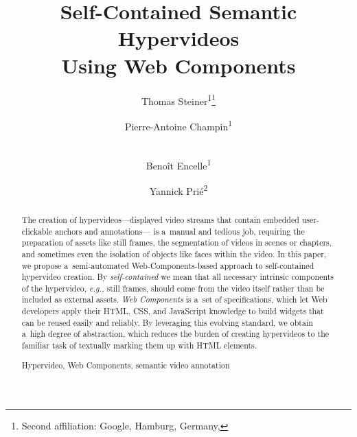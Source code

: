 \documentclass[runningheads,a4paper]{llncs}
\newcommand{\keywords}[1]{\par\addvspace\baselineskip
\noindent\keywordname\enspace\ignorespaces#1}
\begin{document}
\mainmatter  %

\title{Self-Contained Semantic Hypervideos\\ Using Web Components}


\author{
  Thomas Steiner\textsuperscript{1}\thanks{Second affiliation: Google, Hamburg, Germany, } \and
  Pierre-Antoine Champin\textsuperscript{1} \and \\
  Benoît Encelle\textsuperscript{1}\and
  Yannick Prié\textsuperscript{2}
}
%


\maketitle

\begin{abstract}
The creation of hypervideos---displayed video streams
that contain embedded user-clickable anchors and annotations---%
is a~manual and tedious job,
requiring the preparation of assets like still frames,
the segmentation of videos in scenes or chapters,
and sometimes even the isolation of objects
like faces within the video.
In this paper, we propose a~semi-automated
Web-Components-based approach to self-contained hypervideo creation.
By \emph{self-contained} we mean that all necessary intrinsic components
of the hypervideo, \emph{e.g.}, still frames,
should come from the video itself
rather than be included as external assets.
\emph{Web Components} is a~set of specifications,
which let Web developers apply their HTML, CSS,
and JavaScript knowledge to build widgets
that can be reused easily and reliably.
By leveraging this evolving standard,
we obtain a~high degree of abstraction,
which reduces the burden of creating hypervideos
to the familiar task of textually marking them up with HTML elements.

\keywords{Hypervideo, Web Components, semantic video annotation}
\end{abstract}
\end{document}
